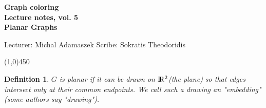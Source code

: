 \documentclass[a4paper]{article}
\theoremstyle{plain}
\newtheorem{definition}[lemma]{Definition}
\theoremstyle{myremark}
\begin{document}
\thispagestyle{empty}

\begin{center}
	{\Large\bf Graph coloring}\\
	{\bf Lecture notes, vol. 5 \\ Planar Graphs}\\
\end{center}
Lecturer: Michal Adamaszek \hfill Scribe: Sokratis Theodoridis
\begin{center}
\line(1,0){450}
\end{center}

 
\begin{definition}
$G$ is \emph{planar} if it can be drawn on ${\rm I\!R^2}$(the plane) so that edges intersect only at their common endpoints.
We call such a drawing an \emph{"embedding"}(some authors say \emph{"drawing"}).
\end{definition}
\end{document}

